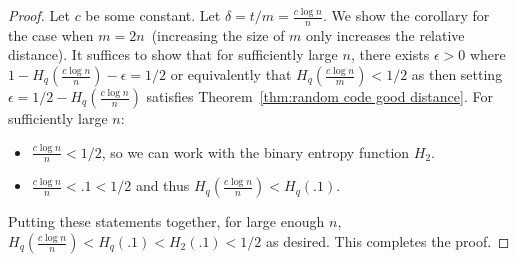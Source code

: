 \documentclass[11pt]{article}
\newcommand{\thref}[1]{\mbox{Theorem~\ref{#1}}}
\begin{document}
\begin{proof}
Let $c$ be some constant.  Let $\delta = t/m = \frac{c\log n}{n}$.  We show the corollary for the case when $m = 2n$~(increasing the size of $m$ only increases the relative distance).  It suffices to show that for sufficiently large $n$, there exists $\epsilon>0$ where $1- H_q(\frac{c\log n}{n}) - \epsilon = 1/2$ or equivalently that $H_q(\frac{c\log n}{m})< 1/2$ as then setting $\epsilon = 1/2-H_q(\frac{c\log n}{n})$ satisfies  \thref{thm:random code good distance}.  For sufficiently large $n$:
\begin{itemize}
\item $\frac{c\log n}{n}< 1/2$, so we can work with the binary entropy function $H_2$.  
\item $\frac{c\log n}{n}< .1 < 1/2$ and thus $H_q(\frac{c\log n}{n})< H_q(.1)$. 
\end{itemize}  Putting these statements together, for large enough $n$, $H_q(\frac{c\log n}{n})< H_q(.1) < H_2(.1)< 1/2$ as desired.  This completes the proof.

\end{proof}
\end{document}
